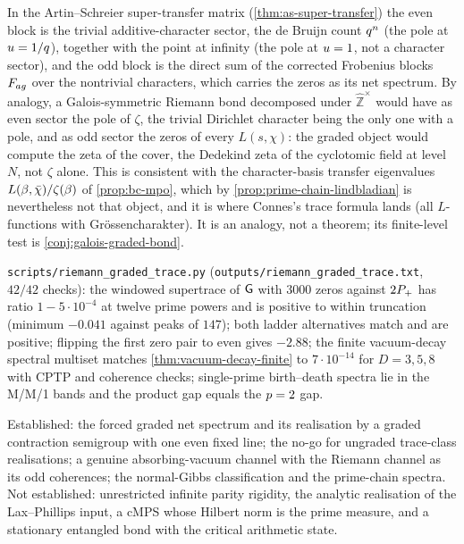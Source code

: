\begin{observation}
\label{obs:character-sector-grading}
In the Artin--Schreier super-transfer matrix (\cref{thm:as-super-transfer}) the even
block is the trivial additive-character sector, the de Bruijn count $q^n$ (the pole at
$u=1/q$), together with the point at infinity (the pole at $u=1$, not a character
sector), and the odd block is the direct sum of the corrected Frobenius blocks
$F_{ag}$ over the nontrivial characters, which carries the zeros as its net spectrum. By analogy, a Galois-symmetric
Riemann bond decomposed under $\hat{\mathbb Z}^\times$ would have as even sector the pole
of $\zeta$, the trivial Dirichlet character being the only one with a pole, and as odd
sector the zeros of every $L(s,\chi)$: the graded object would compute the zeta of the
cover, the Dedekind zeta of the cyclotomic field at level $N$, not $\zeta$ alone. This is
consistent with the character-basis transfer eigenvalues $L(\beta,\bar\chi)/\zeta(\beta)$
of \cref{prop:bc-mpo}, which by \cref{prop:prime-chain-lindbladian} is nevertheless not
that object, and it is where Connes's trace formula lands (all $L$-functions with
Gr\"ossencharakter). It is an
analogy, not a theorem; its finite-level test is \cref{conj:galois-graded-bond}.
\end{observation}

\begin{numerical}
\label{num:riemann-graded-trace}
\texttt{scripts/riemann\_graded\_trace.py} (\texttt{outputs/riemann\_graded\_trace.txt},
$42/42$ checks): the windowed supertrace of $\mathsf G$ with $3000$ zeros against $2P_{+}$ has
ratio $1-5\cdot10^{-4}$ at twelve prime powers and is positive to within truncation
(minimum $-0.041$ against peaks of $147$); both ladder alternatives match and are
positive; flipping the first zero pair to even gives $-2.88$; the finite vacuum-decay
spectral multiset matches \cref{thm:vacuum-decay-finite} to $7\cdot10^{-14}$ for
$D = 3, 5, 8$ with CPTP and coherence checks; single-prime birth--death spectra lie in
the M/M/1 bands and the product gap equals the $p=2$ gap.
\end{numerical}

\begin{observation}
\label{obs:phantasm-established-scope}
Established: the forced graded net spectrum and its realisation by a graded contraction
semigroup with one even fixed line; the no-go for ungraded trace-class realisations; a
genuine absorbing-vacuum channel with the Riemann channel as its odd coherences; the
normal-Gibbs classification and the prime-chain spectra. Not established: unrestricted
infinite parity rigidity, the analytic realisation of the Lax--Phillips input, a cMPS
whose Hilbert norm is the prime measure, and a stationary entangled bond with the
critical arithmetic state.
\end{observation}
